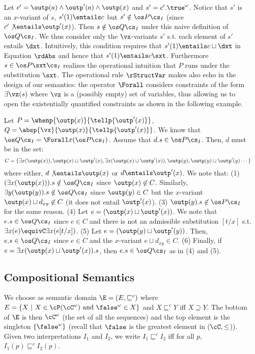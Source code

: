\documentclass{tlp}
\begin{document}
Let $c'=\outp(a)\wedge \outp'(a)\wedge \outp(x)$
and $s'=c'.\true^\omega$.  Notice that  $s'$ is an  $x$-variant   of $s$,  $s'(1) \entails c$ but $s' \notin \os P \cs_I$ (since $c' \not\entails \outp'(x)$). Then $s \notin \os Q\cs_I$ under this naive definition of $\os Q\cs_I$. We thus consider only the $\vx$-variants $s'$ s.t. each element of $s'$ entails $\dxt$.    Intuitively, this condition 
requires that  $s'(1) \entails c \sqcup \dxt$ in Equation $\rdAbs$ 
and hence that $s'(1) \entails c \sxt$. Furthermore  $s \in \os P\sxt \cs_I$ realizes the operational intuition that $P$ runs under the substitution $\sxt$. 
The operational rule $\rStructVar$ makes also echo in the design of our   semantics: the operator $\Forall$ considers   constraints of the form $\exists \vz(s)$ where $\vz$ is a (possibly empty) set of variables, thus  allowing us to open the existentially quantified constraints as shown in the following example.

\begin{example}
Let $P = \whenp{\outp(x)}{\tellp{\outp'(x)}}$, $Q = \absp{\vx}{\outp(x)}{\tellp{\outp'(x)}}$.
We know that $\os Q \cs_I = \Forall x(\os P\cs_I)$. Assume that $d.s \in \os P\cs_I$. Then, $d$ must be in the set:
\[
C= \{\exists x(\outp(x)), \outp(x) \sqcup \outp'(x), \exists x(\outp(x) \sqcup \outp'(x)) , \outp(y),\outp(y)\sqcup \outp'(y) \cdots\}
\]
where either, $d\not\entails \outp(x)$ or $d \entails \outp'(x)$. 
We note that: (1) $(\exists x(\outp(x))).s \notin \os Q\cs_I$ since $\outp(x)  \not\in C$. Similarly, $\exists y(\outp(y)).s \notin \os Q \cs_I$ since $\outp(y) \in C$ but the $x$-variant $\outp(x)\sqcup d_{xy} \not\in C$ (it does not entail $\outp'(x)$).
(3) $\outp(y).s\not\in \os P \cs_I$ for the same reason. (4) Let $e=(\outp(x)\sqcup \outp'(x))$.
We note that $e.s \in \os Q\cs_I$ since $e\in C$ and
there is not an admissible substitution $[t/x]$ s.t. 
$\exists x(e) \equivC \exists x (e[t/x])$. (5) Let 
$e=(\outp(y)\sqcup \outp'(y))$. Then, $e.s\in \os Q \cs_I$ since $e\in C$ and the $x$-variant $e \sqcup d_{xy} \in C$. (6) Finally, if 
$ e = \exists x (\outp(x)\sqcup \outp'(x)).s$, then $e.s \in \os Q \cs_I$  as in  (4) and (5). 

\end{example}



 




\subsection{Compositional Semantics}
We choose as semantic domain  $\E=(E,\sqsubseteq^c)$ where $E = \{ X  \ | \  X \in \cP(\cC^\omega) \mbox{ and } \false^\omega \in X\}$ and $X \sqsubseteq^c Y$ iff $X \supseteq Y$. 
The bottom of  $\E$ is then $\cC^\omega$ (the set of all the sequences) and 
the top element is the singleton $\{\false^\omega\}$ (recall that   $\false$ is the greatest element in ($\cC,\leq$)). 
Given two interpretations $I_1$ and $I_2$, we write $I_1 \sqsubseteq^c I_2$ 
iff for all $p$, $I_1(p) \sqsubseteq^{c} I_2(p)$. 
\end{document}
